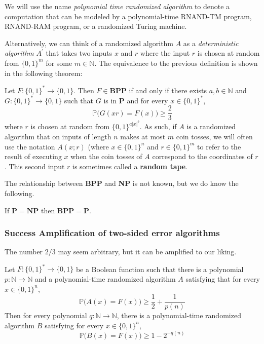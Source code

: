   We will use the name \textit{polynomial time randomized algorithm} to denote a computation that can be modeled by a polynomial-time RNAND-TM program, RNAND-RAM program, or a randomized Turing machine. 

  Alternatively, we can think of a randomized algorithm $A$ as a \textit{deterministic algorithm} $A^\prime$ that takes two inputs $x$ and $r$ where the input $r$ is chosen at random from $\{0, 1\}^m$ for some $m \in \mathbb{N}$. The equivalence to the previous definition is shown in the following theorem: 

  \begin{definition}
  Let $F: \{0, 1\}^* \longrightarrow \{0, 1\}$. Then $F \in \mathbf{BPP}$ if and only if there exists $a, b \in \mathbb{N}$ and $G: \{0, 1\}^* \longrightarrow \{0, 1\}$ such that $G$ is in $\mathbf{P}$ and for every $x \in \{0, 1\}^*$, 
  \[\mathbb{P}\big( G(xr) = F(x)\big) \geq \frac{2}{3}\]
  where $r$ is chosen at random from $\{0, 1\}^{a|x|^b}$. As such, if $A$ is a randomized algorithm that on inputs of length $n$ makes at most $m$ coin tosses, we will often use the notation $A(x; r)$ (where $x \in \{0, 1\}^n$ and $r \in \{0, 1\}^m$ to refer to the result of executing $x$ when the coin tosses of $A$ correspond to the coordinates of $r$. This second input $r$ is sometimes called a \textbf{random tape}.
  \end{definition}

  The relationship between \textbf{BPP} and \textbf{NP} is not known, but we do know the following. 

  \begin{theorem}
  If $\mathbf{P = NP}$ then $\mathbf{BPP = P}$. 
  \end{theorem}

  \subsubsection{Success Amplification of two-sided error algorithms}
  The number $2/3$ may seem arbitrary, but it can be amplified to our liking.

  \begin{theorem}[Amplification]
  Let $F: \{0, 1\}^* \longrightarrow \{0, 1\}$ be a Boolean function such that there is a polynomial $p: \mathbb{N} \longrightarrow \mathbb{N}$ and a polynomial-time randomized algorithm $A$ satisfying that for every $x \in \{0, 1\}^n$, 
  \[\mathbb{P} \big( A(x) = F(x) \big) \geq \frac{1}{2} + \frac{1}{p(n)}\]
  Then for every polynomial $q: \mathbb{N} \longrightarrow \mathbb{N}$, there is a polynomial-time randomized algorithm $B$ satisfying for every $x \in \{0, 1\}^n$,
  \[\mathbb{P} \big( B(x) = F(x)\big) \geq 1 - 2^{-q(n)}\]
  \end{theorem}


